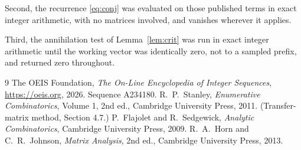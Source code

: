 \documentclass[11pt,a4paper]{article}
\theoremstyle{plain}
\theoremstyle{definition}
\begin{document}
Second, the recurrence \eqref{eq:conj} was evaluated on those published terms in exact
integer arithmetic, with no matrices involved, and vanishes wherever it applies.

Third, the annihilation test of Lemma~\ref{lem:crit} was run in exact integer arithmetic
until the working vector was identically zero, not to a sampled prefix, and returned zero
throughout.

\begin{thebibliography}{9}
 The OEIS Foundation, \emph{The On-Line Encyclopedia of Integer
Sequences}, \url{https://oeis.org}, 2026. Sequence A234180.
 R.~P.~Stanley, \emph{Enumerative Combinatorics}, Volume 1, 2nd ed.,
Cambridge University Press, 2011. (Transfer-matrix method, Section 4.7.)
 P.~Flajolet and R.~Sedgewick, \emph{Analytic Combinatorics}, Cambridge
University Press, 2009.
 R.~A.~Horn and C.~R.~Johnson, \emph{Matrix Analysis}, 2nd ed., Cambridge
University Press, 2013.
\end{thebibliography}
\end{document}
